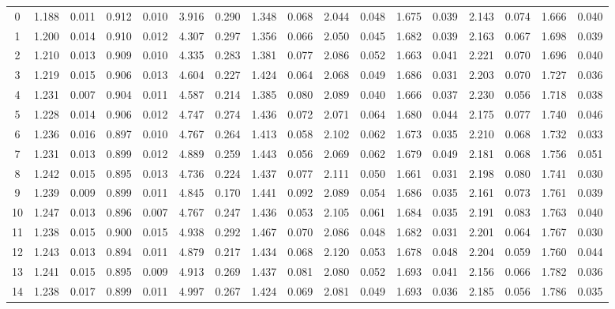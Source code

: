 \documentclass{article}
\begin{document}
\begin{table}[H]
{\begin{tabular}{|c|c|c|c|c|c|c|c|c|c|c|c|c|c|c|c|c|}
   0 & 1.188 & 0.011 & 0.912 & 0.010 & 3.916 & 0.290 & 1.348 & 0.068 & 2.044 & 0.048 & 1.675 & 0.039 & 2.143 & 0.074 & 1.666 & 0.040 \\ 
     1 & 1.200 & 0.014 & 0.910 & 0.012 & 4.307 & 0.297 & 1.356 & 0.066 & 2.050 & 0.045 & 1.682 & 0.039 & 2.163 & 0.067 & 1.698 & 0.039 \\ 
     2 & 1.210 & 0.013 & 0.909 & 0.010 & 4.335 & 0.283 & 1.381 & 0.077 & 2.086 & 0.052 & 1.663 & 0.041 & 2.221 & 0.070 & 1.696 & 0.040 \\ 
     3 & 1.219 & 0.015 & 0.906 & 0.013 & 4.604 & 0.227 & 1.424 & 0.064 & 2.068 & 0.049 & 1.686 & 0.031 & 2.203 & 0.070 & 1.727 & 0.036 \\ 
     4 & 1.231 & 0.007 & 0.904 & 0.011 & 4.587 & 0.214 & 1.385 & 0.080 & 2.089 & 0.040 & 1.666 & 0.037 & 2.230 & 0.056 & 1.718 & 0.038 \\ 
     5 & 1.228 & 0.014 & 0.906 & 0.012 & 4.747 & 0.274 & 1.436 & 0.072 & 2.071 & 0.064 & 1.680 & 0.044 & 2.175 & 0.077 & 1.740 & 0.046 \\ 
     6 & 1.236 & 0.016 & 0.897 & 0.010 & 4.767 & 0.264 & 1.413 & 0.058 & 2.102 & 0.062 & 1.673 & 0.035 & 2.210 & 0.068 & 1.732 & 0.033 \\ 
     7 & 1.231 & 0.013 & 0.899 & 0.012 & 4.889 & 0.259 & 1.443 & 0.056 & 2.069 & 0.062 & 1.679 & 0.049 & 2.181 & 0.068 & 1.756 & 0.051 \\ 
     8 & 1.242 & 0.015 & 0.895 & 0.013 & 4.736 & 0.224 & 1.437 & 0.077 & 2.111 & 0.050 & 1.661 & 0.031 & 2.198 & 0.080 & 1.741 & 0.030 \\ 
     9 & 1.239 & 0.009 & 0.899 & 0.011 & 4.845 & 0.170 & 1.441 & 0.092 & 2.089 & 0.054 & 1.686 & 0.035 & 2.161 & 0.073 & 1.761 & 0.039 \\ 
    10 & 1.247 & 0.013 & 0.896 & 0.007 & 4.767 & 0.247 & 1.436 & 0.053 & 2.105 & 0.061 & 1.684 & 0.035 & 2.191 & 0.083 & 1.763 & 0.040 \\ 
    11 & 1.238 & 0.015 & 0.900 & 0.015 & 4.938 & 0.292 & 1.467 & 0.070 & 2.086 & 0.048 & 1.682 & 0.031 & 2.201 & 0.064 & 1.767 & 0.030 \\ 
    12 & 1.243 & 0.013 & 0.894 & 0.011 & 4.879 & 0.217 & 1.434 & 0.068 & 2.120 & 0.053 & 1.678 & 0.048 & 2.204 & 0.059 & 1.760 & 0.044 \\ 
    13 & 1.241 & 0.015 & 0.895 & 0.009 & 4.913 & 0.269 & 1.437 & 0.081 & 2.080 & 0.052 & 1.693 & 0.041 & 2.156 & 0.066 & 1.782 & 0.036 \\ 
    14 & 1.238 & 0.017 & 0.899 & 0.011 & 4.997 & 0.267 & 1.424 & 0.069 & 2.081 & 0.049 & 1.693 & 0.036 & 2.185 & 0.056 & 1.786 & 0.035 \\ 

\end{tabular}}
\end{table}
\end{document}
